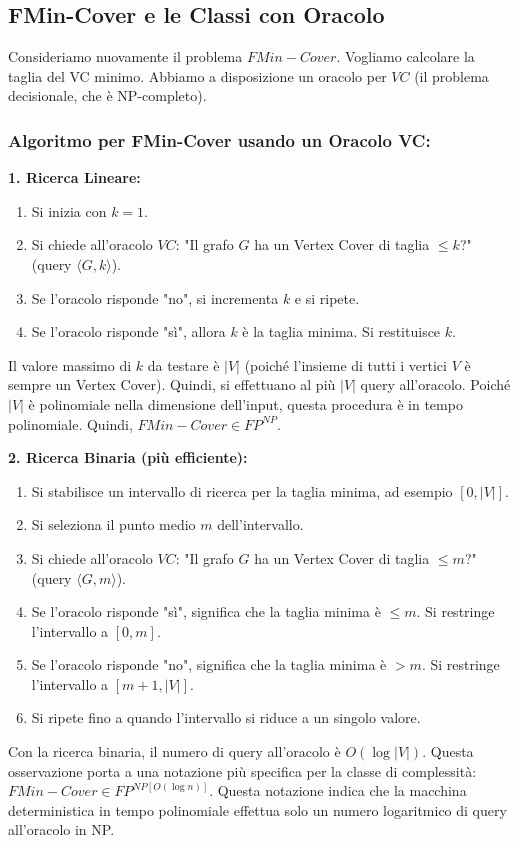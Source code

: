 \documentclass[a4paper]{article}
\begin{document}
\subsection{FMin-Cover e le Classi con Oracolo}
Consideriamo nuovamente il problema $FMin-Cover$. Vogliamo calcolare la taglia del VC minimo. Abbiamo a disposizione un oracolo per $VC$ (il problema decisionale, che è NP-completo).

\subsubsection{Algoritmo per FMin-Cover usando un Oracolo VC:}
\textbf{1. Ricerca Lineare:}
\begin{enumerate}
    \item Si inizia con $k=1$.
    \item Si chiede all'oracolo $VC$: "Il grafo $G$ ha un Vertex Cover di taglia $\le k$?" (query $\langle G, k \rangle$).
    \item Se l'oracolo risponde "no", si incrementa $k$ e si ripete.
    \item Se l'oracolo risponde "sì", allora $k$ è la taglia minima. Si restituisce $k$.
\end{enumerate}
Il valore massimo di $k$ da testare è $|V|$ (poiché l'insieme di tutti i vertici $V$ è sempre un Vertex Cover). Quindi, si effettuano al più $|V|$ query all'oracolo. Poiché $|V|$ è polinomiale nella dimensione dell'input, questa procedura è in tempo polinomiale.
Quindi, $FMin-Cover \in FP^{NP}$.

\textbf{2. Ricerca Binaria (più efficiente):}
\begin{enumerate}
    \item Si stabilisce un intervallo di ricerca per la taglia minima, ad esempio $[0, |V|]$.
    \item Si seleziona il punto medio $m$ dell'intervallo.
    \item Si chiede all'oracolo $VC$: "Il grafo $G$ ha un Vertex Cover di taglia $\le m$?" (query $\langle G, m \rangle$).
    \item Se l'oracolo risponde "sì", significa che la taglia minima è $\le m$. Si restringe l'intervallo a $[0, m]$.
    \item Se l'oracolo risponde "no", significa che la taglia minima è $> m$. Si restringe l'intervallo a $[m+1, |V|]$.
    \item Si ripete fino a quando l'intervallo si riduce a un singolo valore.
\end{enumerate}
Con la ricerca binaria, il numero di query all'oracolo è $O(\log |V|)$.
Questa osservazione porta a una notazione più specifica per la classe di complessità:
$FMin-Cover \in FP^{NP[O(\log n)]}$. Questa notazione indica che la macchina deterministica in tempo polinomiale effettua solo un numero logaritmico di query all'oracolo in NP.
\end{document}
